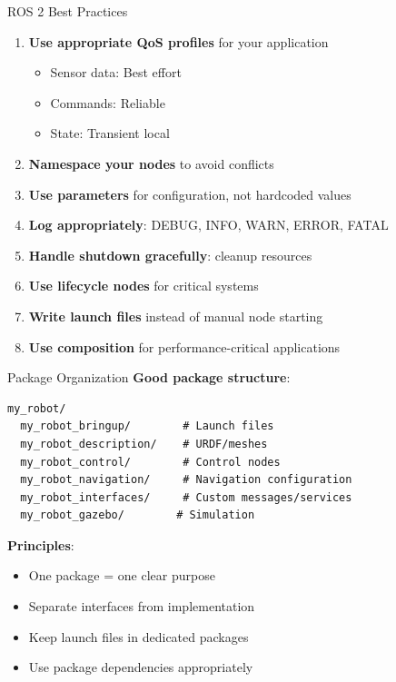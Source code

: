 \begin{frame}{ROS 2 Best Practices}
    \begin{enumerate}
        \item \textbf{Use appropriate QoS profiles} for your application
              \begin{itemize}
                  \item Sensor data: Best effort
                  \item Commands: Reliable
                  \item State: Transient local
              \end{itemize}

        \item \textbf{Namespace your nodes} to avoid conflicts

        \item \textbf{Use parameters} for configuration, not hardcoded values

        \item \textbf{Log appropriately}: DEBUG, INFO, WARN, ERROR, FATAL

        \item \textbf{Handle shutdown gracefully}: cleanup resources

        \item \textbf{Use lifecycle nodes} for critical systems

        \item \textbf{Write launch files} instead of manual node starting

        \item \textbf{Use composition} for performance-critical applications
    \end{enumerate}
\end{frame}

\begin{frame}[fragile]{Package Organization}
    \textbf{Good package structure}:
    \begin{lstlisting}[language=syntax]
my_robot/
  my_robot_bringup/        # Launch files
  my_robot_description/    # URDF/meshes
  my_robot_control/        # Control nodes
  my_robot_navigation/     # Navigation configuration
  my_robot_interfaces/     # Custom messages/services
  my_robot_gazebo/        # Simulation
\end{lstlisting}

    \textbf{Principles}:
    \begin{itemize}
        \item One package = one clear purpose
        \item Separate interfaces from implementation
        \item Keep launch files in dedicated packages
        \item Use package dependencies appropriately
    \end{itemize}
\end{frame}

